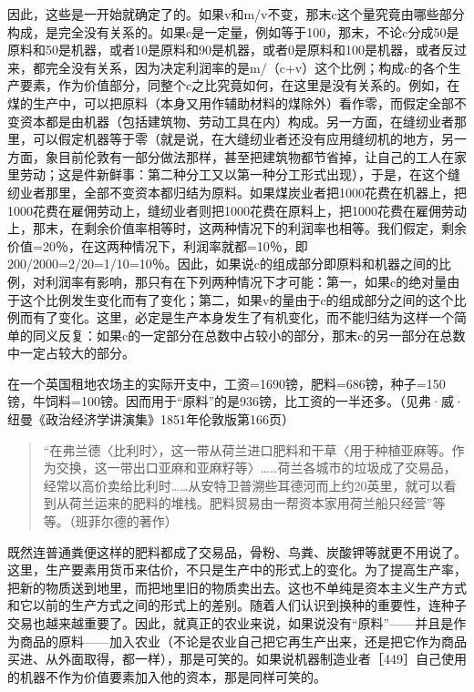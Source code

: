 因此，这些是一开始就确定了的。如果v和m/v不变，那末c这个量究竟由哪些部分构成，是完全没有关系的。如果c是一定量，例如等于100，那末，不论c分成50是原料和50是机器，或者10是原料和90是机器，或者0是原料和100是机器，或者反过来，都完全没有关系，因为决定利润率的是m/（c+v）这个比例；构成c的各个生产要素，作为价值部分，同整个c之比究竟如何，在这里是没有关系的。例如，在煤的生产中，可以把原料（本身又用作辅助材料的煤除外）看作零，而假定全部不变资本都是由机器（包括建筑物、劳动工具在内）构成。另一方面，在缝纫业者那里，可以假定机器等于零（就是说，在大缝纫业者还没有应用缝纫机的地方，另一方面，象目前伦敦有一部分做法那样，甚至把建筑物都节省掉，让自己的工人在家里劳动；这是件新鲜事：第二种分工又以第一种分工形式出现），于是，在这个缝纫业者那里，全部不变资本都归结为原料。如果煤炭业者把1000花费在机器上，把1000花费在雇佣劳动上，缝纫业者则把1000花费在原料上，把1000花费在雇佣劳动上，那末，在剩余价值率相等时，这两种情况下的利润率也相等。我们假定，剩余价值=20％，在这两种情况下，利润率就都=10％，即200/2000=2/20=1/10=10％。因此，如果说c的组成部分即原料和机器之间的比例，对利润率有影响，那只有在下列两种情况下才可能：第一，如果c的绝对量由于这个比例发生变化而有了变化；第二，如果v的量由于c的组成部分之间的这个比例而有了变化。这里，必定是生产本身发生了有机变化，而不能归结为这样一个简单的同义反复：如果c的一定部分在总数中占较小的部分，那末c的另一部分在总数中一定占较大的部分。

在一个英国租地农场主的实际开支中，工资=1690镑，肥料=686镑，种子=150镑，牛饲料=100镑。因而用于“原料”的是936镑，比工资的一半还多。（见弗·威·纽曼《政治经济学讲演集》1851年伦敦版第166页）

\begin{quote}{“在弗兰德〈比利时〉，这一带从荷兰进口肥料和干草〈用于种植亚麻等。作为交换，这一带出口亚麻和亚麻籽等〉……荷兰各城市的垃圾成了交易品，经常以高价卖给比利时……从安特卫普溯些耳德河而上约20英里，就可以看到从荷兰运来的肥料的堆栈。肥料贸易由一帮资本家用荷兰船只经营”等等。（班菲尔德的著作）}\end{quote}

既然连普通粪便这样的肥料都成了交易品，骨粉、鸟粪、炭酸钾等就更不用说了。这里，生产要素用货币来估价，不只是生产中的形式上的变化。为了提高生产率，把新的物质送到地里，而把地里旧的物质卖出去。这也不单纯是资本主义生产方式和它以前的生产方式之间的形式上的差别。随着人们认识到换种的重要性，连种子交易也越来越重要了。因此，就真正的农业来说，如果说没有“原料”——并且是作为商品的原料——加入农业（不论是农业自己把它再生产出来，还是把它作为商品买进、从外面取得，都一样），那是可笑的。如果说机器制造业者［449］自己使用的机器不作为价值要素加入他的资本，那是同样可笑的。

